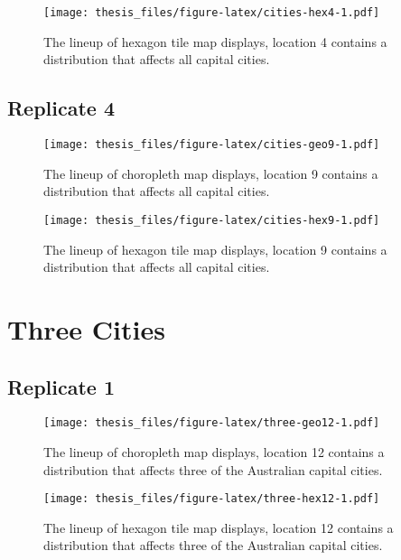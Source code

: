 \documentclass{monashthesis}
\begin{document}
\begin{figure}
\centering
\texttt{[image: thesis\_files/figure-latex/cities-hex4-1.pdf]}
\caption{\label{fig:cities-hex4}The lineup of hexagon tile map displays, location 4 contains a distribution that affects all capital cities.}
\end{figure}

\hypertarget{replicate-4}{%
\subsection{Replicate 4}\label{replicate-4}}

\begin{figure}
\centering
\texttt{[image: thesis\_files/figure-latex/cities-geo9-1.pdf]}
\caption{\label{fig:cities-geo9}The lineup of choropleth map displays, location 9 contains a distribution that affects all capital cities.}
\end{figure}

\begin{figure}
\centering
\texttt{[image: thesis\_files/figure-latex/cities-hex9-1.pdf]}
\caption{\label{fig:cities-hex9}The lineup of hexagon tile map displays, location 9 contains a distribution that affects all capital cities.}
\end{figure}

\hypertarget{three-cities}{%
\section{Three Cities}\label{three-cities}}

\hypertarget{replicate-1-1}{%
\subsection{Replicate 1}\label{replicate-1-1}}

\begin{figure}
\centering
\texttt{[image: thesis\_files/figure-latex/three-geo12-1.pdf]}
\caption{\label{fig:three-geo12}The lineup of choropleth map displays, location 12 contains a distribution that affects three of the Australian capital cities.}
\end{figure}

\begin{figure}
\centering
\texttt{[image: thesis\_files/figure-latex/three-hex12-1.pdf]}
\caption{\label{fig:three-hex12}The lineup of hexagon tile map displays, location 12 contains a distribution that affects three of the Australian capital cities.}
\end{figure}
\end{document}
